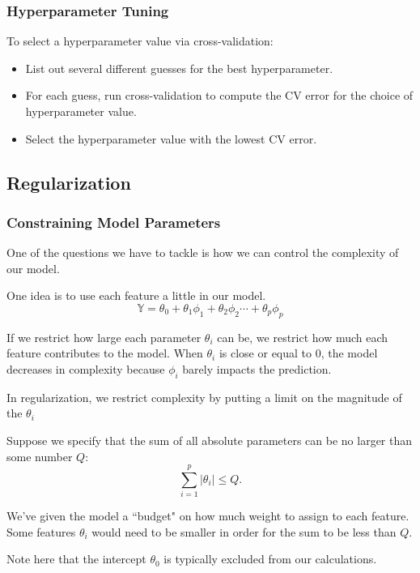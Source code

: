 \documentclass[openany]{book}
\begin{document}
\subsubsection{Hyperparameter Tuning}
To select a hyperparameter value via cross-validation:
\begin{itemize}
	\item List out several different guesses for the best hyperparameter.
	\item For each guess, run cross-validation to compute the CV error for the choice of hyperparameter value.
	\item Select the hyperparameter value with the lowest CV error.
\end{itemize}

\subsection{Regularization}
\subsubsection{Constraining Model Parameters}
One of the questions we have to tackle is how we can control the complexity of our model.

One idea is to use each feature a little in our model.
\begin{equation*}
	\mathbb Y = \theta_0 + \theta_1 \phi_1 + \theta_2\phi_2 \cdots + \theta_p\phi_p
\end{equation*}

If we restrict how large each parameter $\theta_i$ can be, we restrict how much each feature contributes to the model. When $\theta_i$ is close or equal to 0, the model decreases in complexity because $\phi_i$ barely impacts the prediction.

In regularization, we restrict complexity by putting a limit on the magnitude of the $\theta_i$

\begin{example}
	Suppose we specify that the sum of all absolute parameters can be no larger than some number $Q$:
	\begin{equation*}
		\sum_{i=1}^{p} \lvert \theta_i \rvert \leq Q.
	\end{equation*}

	We've given the model a ``budget" on how much weight to assign to each feature. Some features $\theta_i$ would need to be smaller in order for the sum to be less than $Q$.
	
	Note here that the intercept $\theta_0$ is typically excluded from our calculations.
\end{example}
\end{document}
